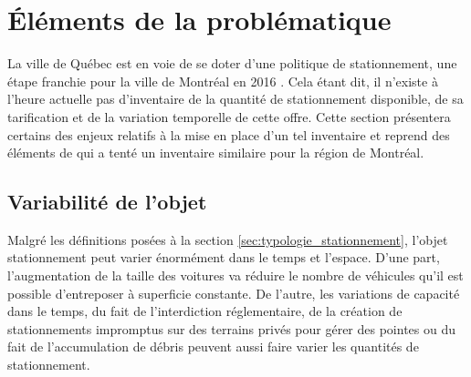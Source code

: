 



\section{Éléments de la problématique}\label{sec:Problematique}  %
La ville de Québec est en voie de se doter d'une politique de stationnement, une étape franchie pour la ville de Montréal en 2016 \parencite{ville_de_montreal_politique_2016}. Cela étant dit, il n'existe à l'heure actuelle pas d'inventaire de la quantité de stationnement disponible, de sa tarification et de la variation temporelle de cette offre. Cette section présentera certains des enjeux relatifs à la mise en place d'un tel inventaire et reprend des éléments de \parencite{bourdeau_methodologie_2014} qui a tenté un inventaire similaire pour la région de Montréal.\par

\subsection{Variabilité de l'objet}
Malgré les définitions posées à la section \ref{sec:typologie_stationnement}, l'objet stationnement peut varier énormément dans le temps et l'espace. D'une part, l'augmentation de la taille des voitures \parencite{pineau_tendances_2023} va réduire le nombre de véhicules qu'il est possible d'entreposer à superficie constante. De l'autre, les variations de capacité dans le temps, du fait de l'interdiction réglementaire, de la création de stationnements impromptus sur des terrains privés pour gérer des pointes ou du fait de l'accumulation de débris peuvent aussi faire varier les quantités de stationnement. 



